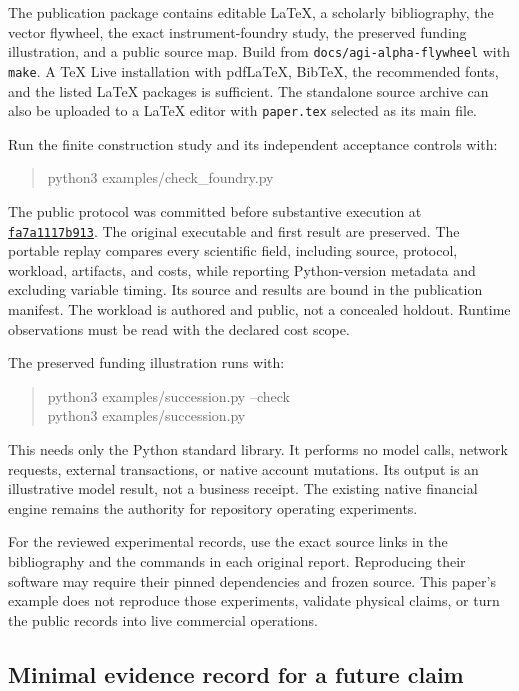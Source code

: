 \documentclass[10pt,a4paper]{article}
\newcommand{\repo}{https://github.com/MontrealAI/AGI-Alpha-Invention-Flywheel-Lab}
\newcommand{\code}[1]{\texttt{#1}}
\begin{document}
The publication package contains editable LaTeX, a scholarly bibliography, the vector flywheel, the exact instrument-foundry study, the preserved funding illustration, and a public source map. Build from \code{docs/agi-alpha-flywheel} with \code{make}. A TeX Live installation with pdfLaTeX, BibTeX, the recommended fonts, and the listed LaTeX packages is sufficient. The standalone source archive can also be uploaded to a LaTeX editor with \code{paper.tex} selected as its main file.

Run the finite construction study and its independent acceptance controls with:
\begin{quote}\small\ttfamily
python3 examples/check\_foundry.py
\end{quote} The public protocol was committed before substantive execution at \href{\repo/commit/fa7a1117b91340afb27288ec09adbc33926d9ba4}{\texttt{fa7a1117b913}}. The original executable and first result are preserved. The portable replay compares every scientific field, including source, protocol, workload, artifacts, and costs, while reporting Python-version metadata and excluding variable timing. Its source and results are bound in the publication manifest. The workload is authored and public, not a concealed holdout. Runtime observations must be read with the declared cost scope.

The preserved funding illustration runs with:
\begin{quote}\small\ttfamily
python3 examples/succession.py --check\\
python3 examples/succession.py
\end{quote}
This needs only the Python standard library. It performs no model calls, network requests, external transactions, or native account mutations. Its output is an illustrative model result, not a business receipt. The existing native financial engine remains the authority for repository operating experiments.

For the reviewed experimental records, use the exact source links in the bibliography and the commands in each original report. Reproducing their software may require their pinned dependencies and frozen source. This paper's example does not reproduce those experiments, validate physical claims, or turn the public records into live commercial operations.

\subsection{Minimal evidence record for a future claim}
\end{document}
